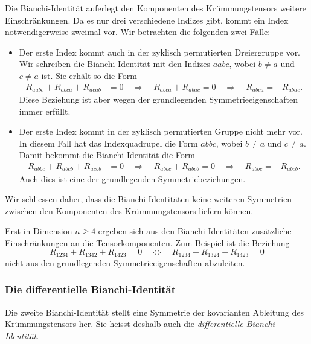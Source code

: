 Die Bianchi-Identität auferlegt den Komponenten des Krümmungstensors
weitere Einschränkungen.
Da es nur drei verschiedene Indizes gibt, kommt ein Index notwendigerweise
zweimal vor.
Wir betrachten die folgenden zwei Fälle:
\begin{itemize}
\item
Der erste Index kommt auch in der zyklisch permutierten
Dreiergruppe vor.
Wir schreiben die Bianchi-Identität mit den Indizes $aabc$,
wobei $b\ne a$ und $c\ne a$ ist.
Sie erhält so die Form
\begin{align*}
R_{aabc}
+
R_{abca}
+
R_{acab}
&=
0
\quad
\Rightarrow
\quad
R_{abca}
+
R_{abac}
=
0
\quad\Rightarrow\quad
R_{abca} = -R_{abac}.
\end{align*}
Diese Beziehung ist aber wegen der grundlegenden Symmetrieeigenschaften
immer erfüllt.
\item
Der erste Index kommt in der zyklisch permutierten Gruppe nicht mehr vor.
In diesem Fall hat das Indexquadrupel die Form $abbc$, wobei $b\ne a$ und
$c\ne a$.
Damit bekommt die Bianchi-Identität die Form
\begin{align*}
R_{abbc}
+
R_{abcb}
+
R_{acbb}
&=
0
\quad \Rightarrow\quad
R_{abbc}
+
R_{abcb}
=
0
\quad\Rightarrow\quad
R_{abbc} = -R_{abcb}.
\end{align*}
Auch dies ist eine der grundlegenden Symmetriebeziehungen.
\end{itemize}
Wir schliessen daher, dass die Bianchi-Identitäten keine weiteren
Symmetrien zwischen den Komponenten des Krümmungstensors liefern
können.

Erst in Dimension $n\ge 4$ ergeben sich aus den Bianchi-Identitäten
zusätzliche Einschränkungen an die Tensorkomponenten.
Zum Beispiel ist die Beziehung
\[
R_{1234}
+
R_{1342}
+
R_{1423}
=
0
\quad\Leftrightarrow\quad
R_{1234}
-
R_{1324}
+
R_{1423}
=
0
\]
nicht aus den grundlegenden Symmetrieeigenschaften abzuleiten.

%
%
\subsubsection{Die differentielle Bianchi-Identität}
Die zweite Bianchi-Identität stellt eine Symmetrie der kovarianten Ableitung
des Krümmungstensors her.
%
%
Sie heisst deshalb auch die \emph{differentielle Bianchi-Identität}.
%
%


